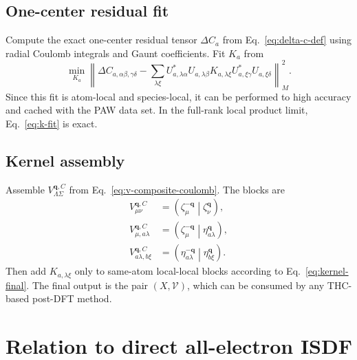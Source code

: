 \documentclass[aps,prb,reprint,superscriptaddress,longbibliography,nofootinbib]{revtex4-2}
\newcommand{\bq}{\mathbf q}
\newcommand{\coul}[2]{\left(#1\middle|#2\right)}
\begin{document}
\subsection{One-center residual fit}

Compute the exact one-center residual tensor \(\Delta C_a\) from Eq.~\eqref{eq:delta-c-def} using radial Coulomb integrals and Gaunt coefficients.  Fit \(K_a\) from
\begin{equation}
\min_{K_a}
\left\|
\Delta C_{a,\alpha\beta,\gamma\delta}
-
\sum_{\lambda\xi}
U_{a,\lambda\alpha}^*U_{a,\lambda\beta}
K_{a,\lambda\xi}
U_{a,\xi\gamma}^*U_{a,\xi\delta}
\right\|_M^2.
\label{eq:k-fit}
\end{equation}
Since this fit is atom-local and species-local, it can be performed to high accuracy and cached with the PAW data set.  In the full-rank local product limit, Eq.~\eqref{eq:k-fit} is exact.

\subsection{Kernel assembly}

Assemble \(V^{\bq,C}_{\Lambda\Sigma}\) from Eq.~\eqref{eq:v-composite-coulomb}.  The blocks are
\begin{subequations}
\begin{align}
V_{\mu\nu}^{\bq,C}
&=\coul{\zeta_\mu^{-\bq}}{\zeta_\nu^{\bq}},
\label{eq:block-gg}\\
V_{\mu,a\lambda}^{\bq,C}
&=\coul{\zeta_\mu^{-\bq}}{\eta_{a\lambda}^{\bq}},
\label{eq:block-gl}\\
V_{a\lambda,b\xi}^{\bq,C}
&=\coul{\eta_{a\lambda}^{-\bq}}{\eta_{b\xi}^{\bq}}.
\label{eq:block-ll}
\end{align}
\end{subequations}
Then add \(K_{a,\lambda\xi}\) only to same-atom local-local blocks according to Eq.~\eqref{eq:kernel-final}.  The final output is the pair \((X,\mathcal V)\), which can be consumed by any THC-based post-DFT method.

\section{Relation to direct all-electron ISDF}
\label{sec:aevariant}
\end{document}
